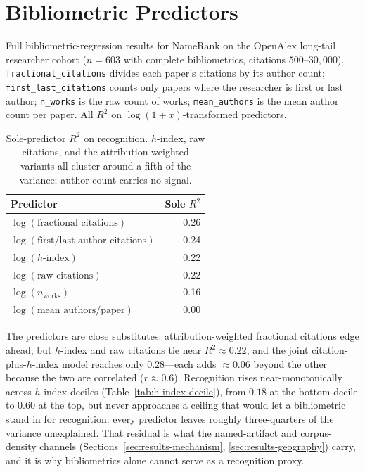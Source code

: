 
\section{Bibliometric Predictors}
\label{app:external}
\label{app:bibliometric}

Full bibliometric-regression results for NameRank on the OpenAlex long-tail researcher cohort ($n = 603$ with complete bibliometrics, citations $500$--$30{,}000$). \texttt{fractional\_citations} divides each paper's citations by its author count; \texttt{first\_last\_citations} counts only papers where the researcher is first or last author; \texttt{n\_works} is the raw count of works; \texttt{mean\_authors} is the mean author count per paper. All $R^2$ on $\log(1+x)$-transformed predictors.

\begin{table}[!htbp]
\centering
\small
\caption{Sole-predictor $R^2$ on recognition. $h$-index, raw citations, and the attribution-weighted variants all cluster around a fifth of the variance; author count carries no signal.}
\label{tab:bibliometric}
\begin{tabular}{lr}
\toprule
Predictor & Sole $R^2$ \\
\midrule
$\log(\text{fractional citations})$ & 0.26 \\
$\log(\text{first/last-author citations})$ & 0.24 \\
$\log(h\text{-index})$ & 0.22 \\
$\log(\text{raw citations})$ & 0.22 \\
$\log(n_\text{works})$ & 0.16 \\
$\log(\text{mean authors/paper})$ & 0.00 \\
\bottomrule
\end{tabular}
\end{table}

The predictors are close substitutes: attribution-weighted fractional citations edge ahead, but $h$-index and raw citations tie near $R^2 \approx 0.22$, and the joint citation-plus-$h$-index model reaches only $0.28$---each adds ${\approx}0.06$ beyond the other because the two are correlated ($r \approx 0.6$). Recognition rises near-monotonically across $h$-index deciles (Table~\ref{tab:h-index-decile}), from $0.18$ at the bottom decile to $0.60$ at the top, but never approaches a ceiling that would let a bibliometric stand in for recognition: every predictor leaves roughly three-quarters of the variance unexplained. That residual is what the named-artifact and corpus-density channels (Sections~\ref{sec:results-mechanism}, \ref{sec:results-geography}) carry, and it is why bibliometrics alone cannot serve as a recognition proxy.

